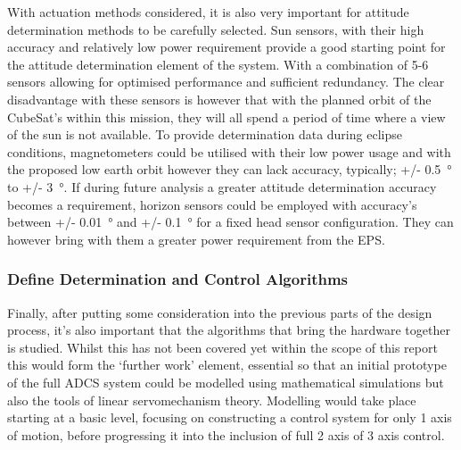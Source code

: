 With actuation methods considered, it is also very important for attitude
determination methods to be carefully selected. Sun sensors, with their high
accuracy and relatively low power requirement provide a good starting point
for the attitude determination element of the system. With a combination of
5-6 sensors allowing for optimised performance and sufficient redundancy.
\cite{Delfi-n3xt} The clear disadvantage with these sensors is however that
with the planned orbit of the CubeSat’s within this mission, they will all spend
a period of time where a view of the sun is not available. To provide determination
data during eclipse conditions, magnetometers could be utilised with their low power
usage and with the proposed low earth orbit however they can lack accuracy, typically;
+/- \SI{0.5}{\degree} to +/- \SI{3}{\degree}. If during future analysis a greater attitude
determination accuracy becomes a requirement, horizon sensors could be employed
with accuracy’s between +/- \SI{0.01}{\degree} and +/- \SI{0.1}{\degree} for a
fixed head sensor configuration. They can however bring with them a greater power
requirement from the EPS.

\subsubsection{Define Determination and Control Algorithms}

Finally, after putting some consideration into the previous parts of the design process, it’s also important that the algorithms that bring the hardware together is studied. Whilst this has not been covered yet within the scope of this report this would form the ‘further work’ element, essential so that an initial prototype of the full ADCS system could be modelled using mathematical simulations but also the tools of linear servomechanism theory. Modelling would take place starting at a basic level, focusing on constructing a control system for only 1 axis of motion, before progressing it into the inclusion of full 2 axis of 3 axis control.
